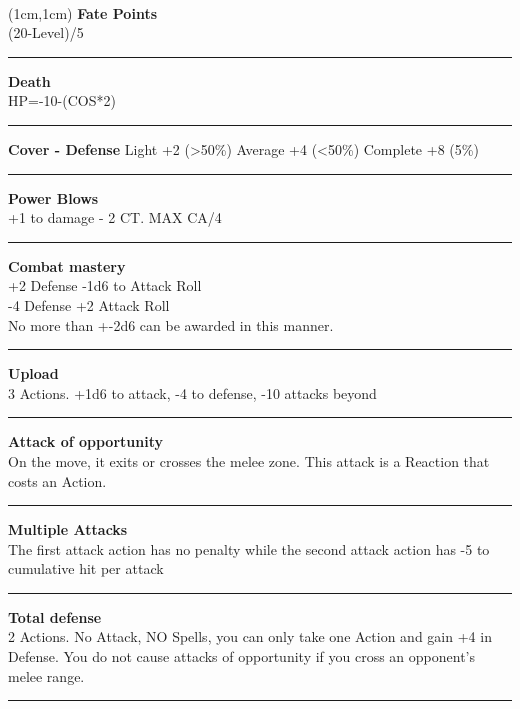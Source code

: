 \documentclass[a4paper,12 pt,openany]{book}
\newcommand{\linex}{\rule{\textwidth}{0.4pt}}
\begin{document}
~\newpage

\begin{textblock*}{4cm}(1cm,1cm) %
{\textbf{Fate Points}\\
(20-Level)/5}

\linex

{\textbf{Death}\\
HP=-10-(COS*2)}

\linex

\textbf{Cover - Defense}
Light +2 (>50\%)
Average +4 (<50\%)
Complete +8 (5\%)

\linex

\textbf{Power Blows}\\
+1 to damage - 2 CT. MAX CA/4

\linex

\textbf{Combat mastery}\\
+2 Defense -1d6 to Attack Roll\\
-4 Defense +2 Attack Roll \\
No more than +-2d6 can be awarded in this manner.

\linex

\textbf{Upload}\\
3 Actions. +1d6 to attack, -4 to defense, -10 attacks beyond

\linex

\textbf{Attack of opportunity}\\
On the move, it exits or crosses the melee zone. This attack is a Reaction that costs an Action.

\linex

\textbf{Multiple Attacks}\\
The first attack action has no penalty while the second attack action has -5 to cumulative hit per attack

\linex

\textbf{Total defense}\\
2 Actions. No Attack, NO Spells, you can only take one Action and gain +4 in Defense. You do not cause attacks of opportunity if you cross an opponent's melee range.

\linex


\end{textblock*}
\end{document}
